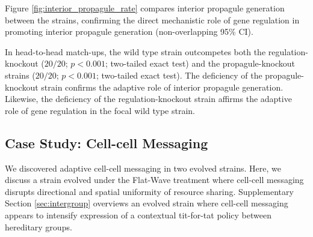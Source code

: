 Figure \ref{fig:interior_propagule_rate} compares interior propagule generation between the strains, confirming the direct mechanistic role of gene regulation in promoting interior propagule generation (non-overlapping 95\% CI).

In head-to-head match-ups, the wild type strain outcompetes both the regulation-knockout ($20/20$; $p < 0.001$; two-tailed exact test) and the propagule-knockout strains
($20/20$; $p < 0.001$; two-tailed exact test).
The deficiency of the propagule-knockout strain confirms the adaptive role of interior propagule generation.
Likewise, the deficiency of the regulation-knockout strain affirms the adaptive role of gene regulation in the focal wild type strain.

\subsection{Case Study: Cell-cell Messaging} \label{sec:cell-cell-messaging}



We discovered adaptive cell-cell messaging in two evolved strains.
Here, we discuss a strain evolved under the Flat-Wave treatment where cell-cell messaging disrupts directional and spatial uniformity of resource sharing.
Supplementary Section \ref{sec:intergroup} overviews an evolved strain where cell-cell messaging appears to intensify expression of a contextual tit-for-tat policy between hereditary groups.

